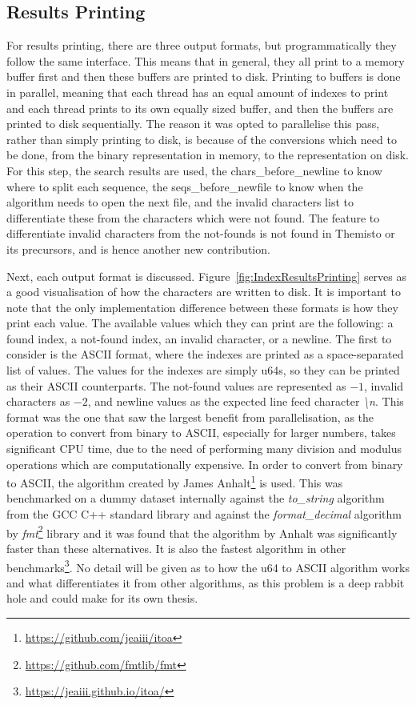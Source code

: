 \subsection{Results Printing}

For results printing, there are three output formats, but programmatically they follow the same interface.
This means that in general, they all print to a memory buffer first and then these buffers are printed to disk.
Printing to buffers is done in parallel, meaning that each thread has an equal amount of indexes to print and each thread prints to its own equally sized buffer, and then the buffers are printed to disk sequentially.
The reason it was opted to parallelise this pass, rather than simply printing to disk, is because of the conversions which need to be done, from the binary representation in memory, to the representation on disk.
For this step, the search results are used, the chars\_before\_newline to know where to split each sequence, the seqs\_before\_newfile to know when the algorithm needs to open the next file, and the invalid characters list to differentiate these from the characters which were not found.
The feature to differentiate invalid characters from the not-founds is not found in Themisto or its precursors, and is hence another new contribution.

Next, each output format is discussed.
Figure~\ref{fig:IndexResultsPrinting} serves as a good visualisation of how the characters are written to disk.
It is important to note that the only implementation difference between these formats is how they print each value.
The available values which they can print are the following: a found index, a not-found index, an invalid character, or a newline.
The first to consider is the ASCII format, where the indexes are printed as a space-separated list of values.
The values for the indexes are simply u64s, so they can be printed as their ASCII counterparts.
The not-found values are represented as $-1$, invalid characters as $-2$, and newline values as the expected line feed character \textit{\textbackslash n}.
This format was the one that saw the largest benefit from parallelisation, as the operation to convert from binary to ASCII, especially for larger numbers, takes significant CPU time, due to the need of performing many division and modulus operations which are computationally expensive.
In order to convert from binary to ASCII, the algorithm created by James Anhalt\footnote{\url{https://github.com/jeaiii/itoa}} is used.
This was benchmarked on a dummy dataset internally against the \textit{to\_string} algorithm from the GCC C++ standard library and against the \textit{format\_decimal} algorithm by \textit{fmt}\footnote{\url{https://github.com/fmtlib/fmt}} library and it was found that the algorithm by Anhalt was significantly faster than these alternatives.
It is also the fastest algorithm in other benchmarks\footnote{\url{https://jeaiii.github.io/itoa/}}.
No detail will be given as to how the u64 to ASCII algorithm works and what differentiates it from other algorithms, as this problem is a deep rabbit hole and could make for its own thesis.

